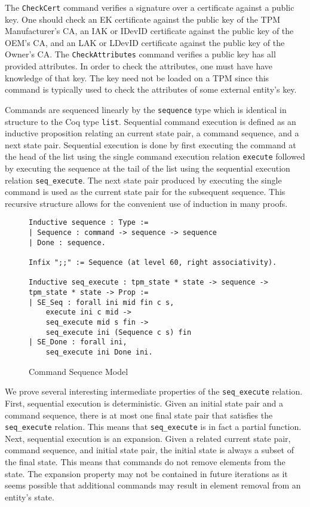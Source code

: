 \documentclass[runningheads]{llncs}
\begin{document}
The \verb|CheckCert| command verifies a signature over a certificate
against a public key. One should check an EK certificate against the
public key of the TPM Manufacturer's CA, an IAK or IDevID certificate
against the public key of the OEM's CA, and an LAK or LDevID
certificate against the public key of the Owner's CA.  The
\verb|CheckAttributes| command verifies a public key has all provided
attributes.  In order to check the attributes, one must have have
knowledge of that key. The key need not be loaded on a TPM since this
command is typically used to check the attributes of some external
entity's key.

Commands are sequenced linearly by the \verb|sequence| type which is
identical in structure to the Coq type \verb|list|. Sequential command
execution is defined as an inductive proposition relating an current
state pair, a command sequence, and a next state pair. Sequential
execution is done by first executing the command at the head of the
list using the single command execution relation \verb|execute|
followed by executing the sequence at the tail of the list using the
sequential execution relation \verb|seq_execute|. The next state pair
produced by executing the single command is used as the current state
pair for the subsequent sequence. This recursive structure allows for
the convenient use of induction in many proofs.

\begin{figure}[hbtp]
\begin{lstlisting}[language=Coq]
Inductive sequence : Type :=
| Sequence : command -> sequence -> sequence
| Done : sequence.

Infix ";;" := Sequence (at level 60, right associativity).

Inductive seq_execute : tpm_state * state -> sequence -> tpm_state * state -> Prop :=
| SE_Seq : forall ini mid fin c s,
    execute ini c mid ->
    seq_execute mid s fin ->
    seq_execute ini (Sequence c s) fin
| SE_Done : forall ini,
    seq_execute ini Done ini.
\end{lstlisting}
\caption{Command Sequence Model}
\label{fig:command-sequence-model}
\end{figure}

We prove several interesting intermediate properties of the
\verb|seq_execute| relation. First, sequential execution is
deterministic. Given an initial state pair and a command sequence,
there is at most one final state pair that satisfies the
\verb|seq_execute| relation. This means that \verb|seq_execute| is in
fact a partial function. Next, sequential execution is an
expansion. Given a related current state pair, command sequence, and
initial state pair, the initial state is always a subset of the final
state. This means that commands do not remove elements from the
state. The expansion property may not be contained in future
iterations as it seems possible that additional commands may result in
element removal from an entity's state.
\end{document}
